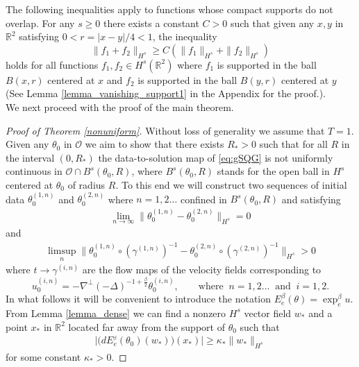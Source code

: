 \documentclass[11pt]{amsart}
\numberwithin{equation}{section}
\begin{document}
The following inequalities apply to functions whose compact supports do not overlap. For any $s\ge 0$ there exists a constant $C > 0$ such that given any $ x,y $ in $\mathbb R^2$ satisfying $0<r={|x-y|}/{4} <1$, the inequality
\begin{equation}\label{ineq2}
	\|f_1+f_2\|_{H^s} \geq C(\|f_1\|_{H^s}+\|f_2\|_{H^s})
\end{equation}
holds for all functions $f_1,f_2 \in H^{s}(\mathbb R^2)$ where $f_1$ is supported in the ball $B(x,r)$ centered at $x$ and $f_2$ is supported in the ball $B(y,r)$ centered at $y$ (See Lemma \ref{lemma_vanishing_support1} in the Appendix for the proof.).\\ 



We next proceed with the proof of 
the main theorem.
% 
\begin{proof}[Proof of Theorem \ref{nonuniform}]
Without loss of generality we assume that $T=1$. Given any $\theta_0$ in $\mathcal{O}$ we aim to show that there exists $R_* > 0$ such that for all $R$ in the interval $(0, R_*)$ the data-to-solution map of \eqref{eq:gSQG} is not uniformly continuous in 
$\mathcal{O}\cap B^{s}(\theta_0,R)$, 
where $B^s(\theta_0,R)$ stands for the open ball in $H^s$ centered at $\theta_0$ of radius $R$. 
To this end we will construct two sequences 
of initial data 
$\theta_0^{(1,n)}$ and $\theta_0^{(2,n)}$ 
where $n = 1, 2 \dots$ 
confined in $B^s(\theta_0,R)$ 
and satisfying 
% 
\begin{align} 
\lim\limits_{n \to \infty} \big\|\theta_0^{(1,n)} - \theta_0^{(2,n)}\big\|_{H^s} 
= 0 
\end{align} 
% 
and 
% 
\begin{align} 
\limsup_n \big\| 
\theta_0^{(1,n)} \circ (\gamma^{(1,n)})^{-1} 
- 
\theta_0^{(2,n)} \circ(\gamma^{(2,n)})^{-1} 
\big\|_{H^s} > 0 
\end{align} 
% 
where 
$t \to \gamma^{(i,n)}$ 
are the flow maps of the velocity fields corresponding to 
$$ 
u_0^{(i,n)} 
= 
-\nabla^\perp(-\Delta)^{-1+\frac{\beta}{2}} \theta_0^{(i,n)}, 
\qquad 
\text{where} 
\;\; n = 1, 2 \dots 
\;\; \text{and} \;\; i=1, 2. 
$$ 
In what follows it will be convenient to introduce 
the notation 
$E_e^{\beta}(\theta)=\exp_{e}^{\beta} u$. 
From Lemma \ref{lemma_dense} we can find 
a nonzero $H^s$ vector field $w_*$ 
and a point $x_*$ in $\mathbb R^2$ located far away 
from the support of $\theta_0$ such that 
% 
\begin{align}\label{e:fromlocdiff}
\big| 
\big( dE_{e}^{_{\beta}}({\theta_0})(w_*)\big)(x_*) 
\big| 
\geq 
\kappa_* \|w_*\|_{H^s} 
\end{align} 
% 
for some constant $\kappa_* > 0$. 


\end{proof}
\end{document}

